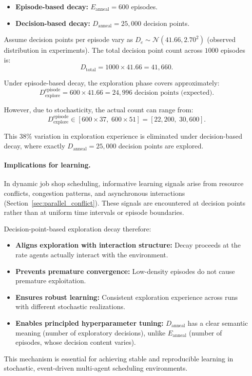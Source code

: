 \begin{itemize}
\item \textbf{Episode-based decay:} $E_{\mathrm{anneal}}=600$ episodes.
\item \textbf{Decision-based decay:} $D_{\mathrm{anneal}}=25{,}000$ decision points.
\end{itemize}

Assume decision points per episode vary as $D_e \sim \mathcal{N}(41.66, 2.70^2)$
(observed distribution in experiments). The total decision point count across
$1000$ episodes is:
\begin{equation}
D_{\mathrm{total}}
=
1000 \times 41.66
=
41{,}660.
\label{eq:total_decisions}
\end{equation}

Under episode-based decay, the exploration phase covers approximately:
\begin{equation}
D_{\mathrm{explore}}^{\mathrm{episode}}
=
600 \times 41.66
=
24{,}996
\text{ decision points (expected)}.
\label{eq:episode_explore_decisions}
\end{equation}

However, due to stochasticity, the actual count can range from:
\begin{equation}
D_{\mathrm{explore}}^{\mathrm{episode}}
\in
[600 \times 37, \; 600 \times 51]
=
[22{,}200, \; 30{,}600].
\label{eq:episode_explore_range}
\end{equation}

This $38\%$ variation in exploration experience is eliminated under decision-based
decay, where exactly $D_{\mathrm{anneal}}=25{,}000$ decision points are explored.

\paragraph{Implications for learning.}
In dynamic job shop scheduling, informative learning signals arise from resource
conflicts, congestion patterns, and asynchronous interactions
(Section~\ref{sec:parallel_conflict}). These signals are encountered at decision
points rather than at uniform time intervals or episode boundaries.

Decision-point-based exploration decay therefore:
\begin{itemize}
\item \textbf{Aligns exploration with interaction structure:} Decay proceeds at
the rate agents actually interact with the environment.

\item \textbf{Prevents premature convergence:} Low-density episodes do not cause
premature exploitation.

\item \textbf{Ensures robust learning:} Consistent exploration experience across
runs with different stochastic realizations.

\item \textbf{Enables principled hyperparameter tuning:} $D_{\mathrm{anneal}}$ has
a clear semantic meaning (number of exploratory decisions), unlike
$E_{\mathrm{anneal}}$ (number of episodes, whose decision content varies).
\end{itemize}

This mechanism is essential for achieving stable and reproducible learning in
stochastic, event-driven multi-agent scheduling environments.
